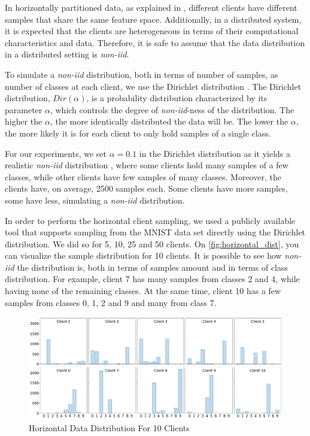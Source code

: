 In horizontally partitioned data, as explained in , different clients have different samples that share the same feature space. Additionally, in a distributed system, it is expected that the clients are heterogeneous in terms of their computational characteristics and data. Therefore, it is safe to assume that the data distribution in a distributed setting is \textit{non-iid}.

To simulate a \textit{non-iid} distribution, both in terms of number of samples, as number of classes at each client, we use the Dirichlet distribution \cite{tim, 10.48550/arxiv.2006.07242}. The Dirichlet distribution, $Dir(\alpha)$, is a probability distribution characterized by its parameter $\alpha$, which controls the degree of \textit{non-iid}-ness of the distribution. The higher the $\alpha$, the more identically distributed the data will be. The lower the $\alpha$, the more likely it is for each client to only hold samples of a single class.

For our experiments, we set $\alpha = 0.1$ in the Dirichlet distribution as it yields a realistic \textit{non-iid} distribution \cite{10.48550/arxiv.2006.07242}, where some clients hold many samples of a few classes, while other clients have few samples of many classes. Moreover, the clients have, on average, 2500 samples each. Some clients have more samples, some have less, simulating a \textit{non-iid} distribution.

In order to perform the horizontal client sampling, we used a publicly available tool \cite{tsingz0} that supports sampling from the MNIST data set directly using the Dirichlet distribution. We did so for 5, 10, 25 and 50 clients. On \autoref{fig:horizontal_dist}, you can visualize the sample distribution for 10 clients. It is possible to see how \textit{non-iid} the distribution is, both in terms of samples amount and in terms of class distribution. For example, client 7 has many samples from classes 2 and 4, while having none of the remaining classes. At the same time, client 10 has a few samples from classes 0, 1, 2 and 9 and many from class 7.

\begin{figure}[!ht]
    \centering
    \centering
    \includegraphics[width=1\textwidth]{graphics/10_dist.pdf}
    \caption{Horizontal Data Distribution For 10 Clients}
    \label{fig:horizontal_dist}
\end{figure}

